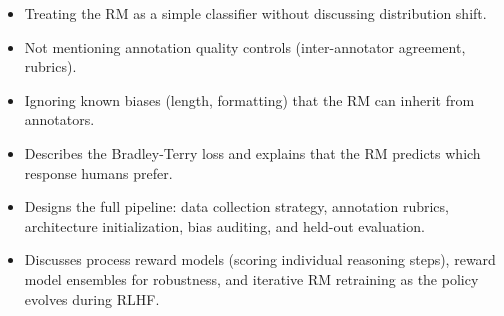 \begin{interviewq}
\redflags
\begin{itemize}
    \item Treating the RM as a simple classifier without discussing distribution shift.
    \item Not mentioning annotation quality controls (inter-annotator agreement, rubrics).
    \item Ignoring known biases (length, formatting) that the RM can inherit from annotators.
\end{itemize}


\goodgreat
\begin{itemize}
    \item {} Describes the Bradley-Terry loss and explains that the RM predicts which response humans prefer.
    \item {} Designs the full pipeline: data collection strategy, annotation rubrics, architecture initialization, bias auditing, and held-out evaluation.
    \item {} Discusses process reward models (scoring individual reasoning steps), reward model ensembles for robustness, and iterative RM retraining as the policy evolves during RLHF.
\end{itemize}

\end{interviewq}


